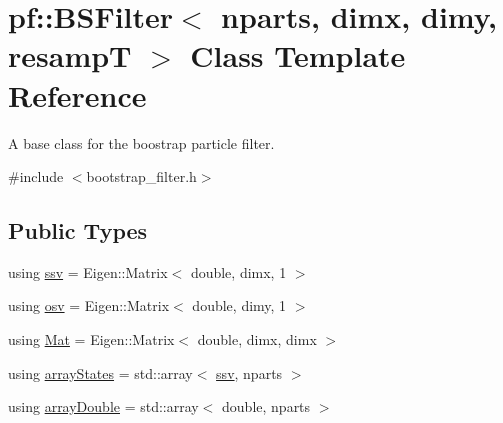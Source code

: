 \hypertarget{classpf_1_1BSFilter}{}\section{pf\+:\+:B\+S\+Filter$<$ nparts, dimx, dimy, resampT $>$ Class Template Reference}
\label{classpf_1_1BSFilter}


A base class for the boostrap particle filter.  




{\ttfamily \#include $<$bootstrap\+\_\+filter.\+h$>$}

\subsection*{Public Types}
\begin{DoxyCompactItemize}
\item 
using \hyperlink{classpf_1_1BSFilter_a95fa891a3af39cb14cfe8521fb1d0f88}{ssv} = Eigen\+::\+Matrix$<$ double, dimx, 1 $>$
\item 
using \hyperlink{classpf_1_1BSFilter_a46aaa88331b87e69ad3d1fcdc3b1db4e}{osv} = Eigen\+::\+Matrix$<$ double, dimy, 1 $>$
\item 
using \hyperlink{classpf_1_1BSFilter_a0fea63439948d095468ec14792abb396}{Mat} = Eigen\+::\+Matrix$<$ double, dimx, dimx $>$
\item 
using \hyperlink{classpf_1_1BSFilter_a567bc3c2a16c2a6f8b4673fe88ebbfda}{array\+States} = std\+::array$<$ \hyperlink{classpf_1_1BSFilter_a95fa891a3af39cb14cfe8521fb1d0f88}{ssv}, nparts $>$
\item 
using \hyperlink{classpf_1_1BSFilter_a770a16204c3c328cc15c5822f4687a8b}{array\+Double} = std\+::array$<$ double, nparts $>$
\end{DoxyCompactItemize}
